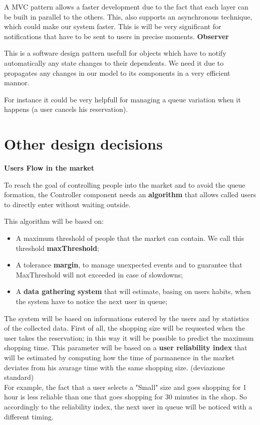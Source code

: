 A MVC pattern allows a faster development due to the fact that each layer can be built in parallel to the others. This, also supports an asynchronous technique, which could make our system faster. This is will be very significant for notifications that have to be sent to users in precise moments.
\bigskip
\textbf{Observer} \par
This is a software design pattern usefull for objects which have to notify automatically any state changes to their dependents. We need it due to propagates any changes in our model to its components in a very efficient mannor.

For instance it could be very helpfull for managing a queue variation when it happens (a user cancels his reservation).


\section{Other design decisions}
\textbf{Users Flow in the market} \par
To reach the goal of controlling people into the market and to avoid the queue formation, the Controller component needs an \textbf{algorithm} that allows called users to directly enter without waiting outside. 

This algorithm will be based on:
\begin{itemize}
\item A maximum threshold of people that the market can contain. We call this threshold \textbf{maxThreshold};
\item A tolerance \textbf{margin}, to manage unexpected events and to guarantee that MaxThreshold will not  exceeded in case of slowdowns;
\item A \textbf{data gathering system} that will estimate, basing on users habits, when the system have to notice the next user in queue;
\end{itemize}


The system will be based on informations entered by the users and by statistics of the collected data.
First of all, the shopping size will be requested when the user takes the reservation; in this way it will be possible to predict the maximum shopping time. 
This parameter will be based on a \textbf{user reliability index} that will be estimated by computing how the time of parmanence in the market deviates from his avarage time with the same shopping size. (deviazione standard) \\
For example, the fact that a user selects a "Small" size and goes shopping for 1 hour is less reliable than one that goes shopping for 30 minutes in the shop.
So accordingly to the reliability index, the next user in queue will be noticed with a different timing.

